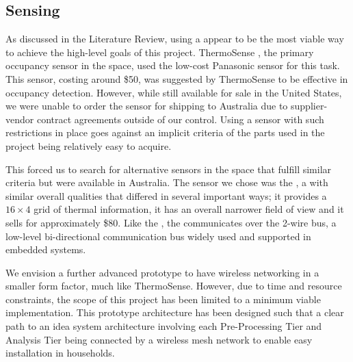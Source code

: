 \documentclass[../thesis/thesis.tex]{subfiles}
\begin{document}
\subsection{Sensing}
As discussed in the Literature Review, using a \iar appear to be the most viable way to achieve the high-level goals of this project. ThermoSense \cite{beltran2013thermosense}, the primary occupancy sensor in the \iar space, used the low-cost Panasonic \geye sensor for this task. This sensor, costing around \$50, was suggested by ThermoSense to be effective in occupancy detection. However, while still available for sale in the United States, we were unable to order the sensor for shipping to Australia due to supplier-vendor contract agreements outside of our control. Using a sensor with such restrictions in place goes against an implicit criteria of the parts used in the project being relatively easy to acquire.

This forced us to search for alternative sensors in the space that fulfill similar criteria but were available in Australia. The sensor we chose was the \mlx \cite{MLXDatasheet}, a \iar with similar overall qualities that differed in several important ways; it provides a $16 \times 4$ grid of thermal information, it has an overall narrower field of view and it sells for approximately \$80. Like the \geye, the \mlx communicates over the 2-wire \iic bus, a low-level bi-directional communication bus widely used and supported in embedded systems.

We envision a further advanced prototype to have wireless networking in a smaller form factor, much like ThermoSense. However, due to time and resource constraints, the scope of this project has been limited to a minimum viable implementation. This prototype architecture has been designed such that a clear path to an idea system architecture involving each Pre-Processing Tier and Analysis Tier being connected by a wireless mesh network to enable easy installation in households.
\end{document}
